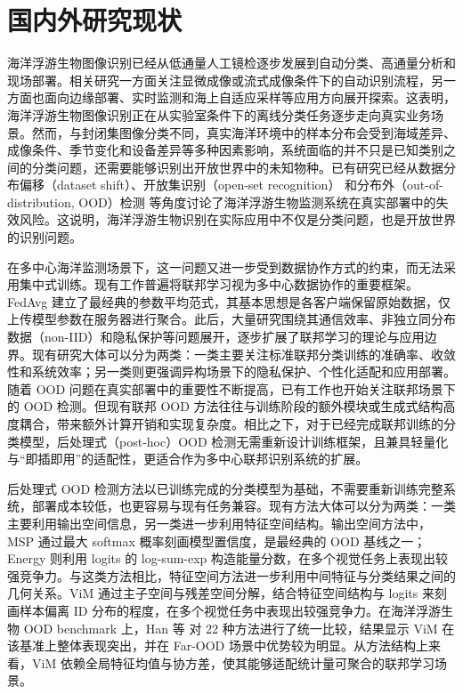 \section{国内外研究现状}

海洋浮游生物图像识别已经从低通量人工镜检逐步发展到自动分类、高通量分析和现场部署\cite{eerola2024survey,pitois2025rapid,schmid2023edge}。相关研究一方面关注显微成像或流式成像条件下的自动识别流程，另一方面也面向边缘部署、实时监测和海上自适应采样等应用方向展开探索\cite{pitois2025rapid,schmid2023edge}。这表明，海洋浮游生物图像识别正在从实验室条件下的离线分类任务逐步走向真实业务场景。然而，与封闭集图像分类不同，真实海洋环境中的样本分布会受到海域差异、成像条件、季节变化和设备差异等多种因素影响，系统面临的并不只是已知类别之间的分类问题，还需要能够识别出开放世界中的未知物种。已有研究已经从数据分布偏移（dataset shift）\cite{chen2025datasetshift}、开放集识别（open-set recognition）\cite{kareinen2025openset} 和分布外（out-of-distribution, OOD）检测\cite{han2025benchmarking} 等角度讨论了海洋浮游生物监测系统在真实部署中的失效风险。这说明，海洋浮游生物识别在实际应用中不仅是分类问题，也是开放世界的识别问题。

在多中心海洋监测场景下，这一问题又进一步受到数据协作方式的约束，而无法采用集中式训练。现有工作普遍将联邦学习视为多中心数据协作的重要框架。FedAvg\cite{mcmahan2017fedavg} 建立了最经典的参数平均范式，其基本思想是各客户端保留原始数据，仅上传模型参数在服务器进行聚合。此后，大量研究围绕其通信效率、非独立同分布数据（non-IID）和隐私保护等问题展开，逐步扩展了联邦学习的理论与应用边界\cite{kairouz2021advances,yang2019federated}。现有研究大体可以分为两类：一类主要关注标准联邦分类训练的准确率、收敛性和系统效率；另一类则更强调异构场景下的隐私保护、个性化适配和应用部署。随着 OOD 问题在真实部署中的重要性不断提高，已有工作也开始关注联邦场景下的 OOD 检测\cite{liao2024foogd}。但现有联邦 OOD 方法往往与训练阶段的额外模块或生成式结构高度耦合，带来额外计算开销和实现复杂度。相比之下，对于已经完成联邦训练的分类模型，后处理式（post-hoc）OOD 检测无需重新设计训练框架，且兼具轻量化与“即插即用”的适配性，更适合作为多中心联邦识别系统的扩展。

后处理式 OOD 检测方法以已训练完成的分类模型为基础，不需要重新训练完整系统，部署成本较低，也更容易与现有任务兼容。现有方法大体可以分为两类：一类主要利用输出空间信息，另一类进一步利用特征空间结构。输出空间方法中，MSP\cite{hendrycks2017baseline} 通过最大 softmax 概率刻画模型置信度，是最经典的 OOD 基线之一；Energy\cite{liu2020energy} 则利用 logits 的 log-sum-exp 构造能量分数，在多个视觉任务上表现出较强竞争力。与这类方法相比，特征空间方法进一步利用中间特征与分类结果之间的几何关系。ViM\cite{wang2022vim} 通过主子空间与残差空间分解，结合特征空间结构与 logits 来刻画样本偏离 ID 分布的程度，在多个视觉任务中表现出较强竞争力。在海洋浮游生物 OOD benchmark 上，Han 等\cite{han2025benchmarking} 对 22 种方法进行了统一比较，结果显示 ViM 在该基准上整体表现突出，并在 Far-OOD 场景中优势较为明显。从方法结构上来看，ViM 依赖全局特征均值与协方差，使其能够适配统计量可聚合的联邦学习场景。

